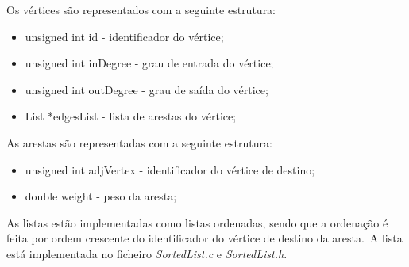 \vspace*{5mm}

Os vértices são representados com a seguinte estrutura:

\begin{itemize}
    \item unsigned int id - identificador do vértice;
    \item unsigned int inDegree - grau de entrada do vértice;
    \item unsigned int outDegree - grau de saída do vértice;
    \item List *edgesList - lista de arestas do vértice;
\end{itemize}

\vspace*{5mm}

As arestas são representadas com a seguinte estrutura:

\begin{itemize}
    \item unsigned int adjVertex - identificador do vértice de destino;
    \item double weight - peso da aresta;
\end{itemize}

\vspace*{5mm}

As listas estão implementadas como listas ordenadas, sendo que a ordenação é feita por ordem crescente do identificador do vértice de destino da aresta.\ A lista está implementada no ficheiro \textit{SortedList.c} e \textit{SortedList.h}.